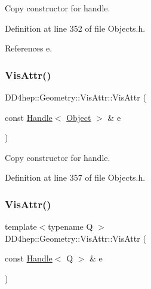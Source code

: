 Copy constructor for handle. 



Definition at line 352 of file Objects.\+h.



References e.

\hypertarget{class_d_d4hep_1_1_geometry_1_1_vis_attr_a2e977728c8f627c4b5dea219d2353fda}{}\label{class_d_d4hep_1_1_geometry_1_1_vis_attr_a2e977728c8f627c4b5dea219d2353fda} 
\subsubsection{\texorpdfstring{Vis\+Attr()}{VisAttr()}\hspace{0.1cm}{\footnotesize\ttfamily [3/6]}}
{\footnotesize\ttfamily D\+D4hep\+::\+Geometry\+::\+Vis\+Attr\+::\+Vis\+Attr (\begin{DoxyParamCaption}\item[{const \hyperlink{class_d_d4hep_1_1_handle}{Handle}$<$ \hyperlink{class_d_d4hep_1_1_geometry_1_1_vis_attr_a8c2a1708a4161f27aed36d464be316cc}{Object} $>$ \&}]{e }\end{DoxyParamCaption})\hspace{0.3cm}{\ttfamily [inline]}}



Copy constructor for handle. 



Definition at line 357 of file Objects.\+h.

\hypertarget{class_d_d4hep_1_1_geometry_1_1_vis_attr_a248f9c0219a5d5ec6c1fa491dac15b02}{}\label{class_d_d4hep_1_1_geometry_1_1_vis_attr_a248f9c0219a5d5ec6c1fa491dac15b02} 
\subsubsection{\texorpdfstring{Vis\+Attr()}{VisAttr()}\hspace{0.1cm}{\footnotesize\ttfamily [4/6]}}
{\footnotesize\ttfamily template$<$typename Q $>$ \\
D\+D4hep\+::\+Geometry\+::\+Vis\+Attr\+::\+Vis\+Attr (\begin{DoxyParamCaption}\item[{const \hyperlink{class_d_d4hep_1_1_handle}{Handle}$<$ Q $>$ \&}]{e }\end{DoxyParamCaption})\hspace{0.3cm}{\ttfamily [inline]}}



